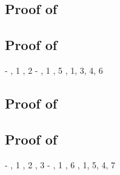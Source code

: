 \subsection*{Proof of }

\begin{derivation}
\end{derivation}



\subsection*{Proof of }

\begin{derivation}
     {\hyp}
     {\Rcxaxmono, 1}
     {\Retrue, 2}
     {\hyp}
\step{\cxwfO}
     {, 1}
\step{\istyO{\bool}}
     {\Rtbool, 5}
     {\Reif, 1, 3, 4, 6}
\end{derivation}



\subsection*{Proof of }

\begin{derivation}
\end{derivation}



\subsection*{Proof of }

\begin{derivation}
     {\hyp}
     {\Renega, 1}
     {\Rcxaxmono, 2}
     {\Retrue, 3}
     {\hyp}
\step{\cxwfO}
     {, 1}
\step{\istyO{\bool}}
     {\Rtbool, 6}
     {\Reif, 1, 5, 4, 7}
\end{derivation}




